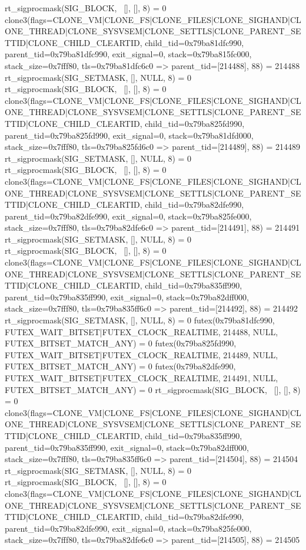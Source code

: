 \begin{breakableverbatim}
rt_sigprocmask(SIG_BLOCK, ~[], [], 8)   = 0
clone3({flags=CLONE_VM|CLONE_FS|CLONE_FILES|CLONE_SIGHAND|CLONE_THREAD|CLONE_SYSVSEM|CLONE_SETTLS|CLONE_PARENT_SETTID|CLONE_CHILD_CLEARTID, child_tid=0x79ba81dfc990, parent_tid=0x79ba81dfc990, exit_signal=0, stack=0x79ba815fc000, stack_size=0x7fff80, tls=0x79ba81dfc6c0} => {parent_tid=[214488]}, 88) = 214488
rt_sigprocmask(SIG_SETMASK, [], NULL, 8) = 0
rt_sigprocmask(SIG_BLOCK, ~[], [], 8)   = 0
clone3({flags=CLONE_VM|CLONE_FS|CLONE_FILES|CLONE_SIGHAND|CLONE_THREAD|CLONE_SYSVSEM|CLONE_SETTLS|CLONE_PARENT_SETTID|CLONE_CHILD_CLEARTID, child_tid=0x79ba825fd990, parent_tid=0x79ba825fd990, exit_signal=0, stack=0x79ba81dfd000, stack_size=0x7fff80, tls=0x79ba825fd6c0} => {parent_tid=[214489]}, 88) = 214489
rt_sigprocmask(SIG_SETMASK, [], NULL, 8) = 0
rt_sigprocmask(SIG_BLOCK, ~[], [], 8)   = 0
clone3({flags=CLONE_VM|CLONE_FS|CLONE_FILES|CLONE_SIGHAND|CLONE_THREAD|CLONE_SYSVSEM|CLONE_SETTLS|CLONE_PARENT_SETTID|CLONE_CHILD_CLEARTID, child_tid=0x79ba82dfe990, parent_tid=0x79ba82dfe990, exit_signal=0, stack=0x79ba825fe000, stack_size=0x7fff80, tls=0x79ba82dfe6c0} => {parent_tid=[214491]}, 88) = 214491
rt_sigprocmask(SIG_SETMASK, [], NULL, 8) = 0
rt_sigprocmask(SIG_BLOCK, ~[], [], 8)   = 0
clone3({flags=CLONE_VM|CLONE_FS|CLONE_FILES|CLONE_SIGHAND|CLONE_THREAD|CLONE_SYSVSEM|CLONE_SETTLS|CLONE_PARENT_SETTID|CLONE_CHILD_CLEARTID, child_tid=0x79ba835ff990, parent_tid=0x79ba835ff990, exit_signal=0, stack=0x79ba82dff000, stack_size=0x7fff80, tls=0x79ba835ff6c0} => {parent_tid=[214492]}, 88) = 214492
rt_sigprocmask(SIG_SETMASK, [], NULL, 8) = 0
futex(0x79ba81dfc990, FUTEX_WAIT_BITSET|FUTEX_CLOCK_REALTIME, 214488, NULL, FUTEX_BITSET_MATCH_ANY) = 0
futex(0x79ba825fd990, FUTEX_WAIT_BITSET|FUTEX_CLOCK_REALTIME, 214489, NULL, FUTEX_BITSET_MATCH_ANY) = 0
futex(0x79ba82dfe990, FUTEX_WAIT_BITSET|FUTEX_CLOCK_REALTIME, 214491, NULL, FUTEX_BITSET_MATCH_ANY) = 0
rt_sigprocmask(SIG_BLOCK, ~[], [], 8)   = 0
clone3({flags=CLONE_VM|CLONE_FS|CLONE_FILES|CLONE_SIGHAND|CLONE_THREAD|CLONE_SYSVSEM|CLONE_SETTLS|CLONE_PARENT_SETTID|CLONE_CHILD_CLEARTID, child_tid=0x79ba835ff990, parent_tid=0x79ba835ff990, exit_signal=0, stack=0x79ba82dff000, stack_size=0x7fff80, tls=0x79ba835ff6c0} => {parent_tid=[214504]}, 88) = 214504
rt_sigprocmask(SIG_SETMASK, [], NULL, 8) = 0
rt_sigprocmask(SIG_BLOCK, ~[], [], 8)   = 0
clone3({flags=CLONE_VM|CLONE_FS|CLONE_FILES|CLONE_SIGHAND|CLONE_THREAD|CLONE_SYSVSEM|CLONE_SETTLS|CLONE_PARENT_SETTID|CLONE_CHILD_CLEARTID, child_tid=0x79ba82dfe990, parent_tid=0x79ba82dfe990, exit_signal=0, stack=0x79ba825fe000, stack_size=0x7fff80, tls=0x79ba82dfe6c0} => {parent_tid=[214505]}, 88) = 214505

\end{breakableverbatim}
